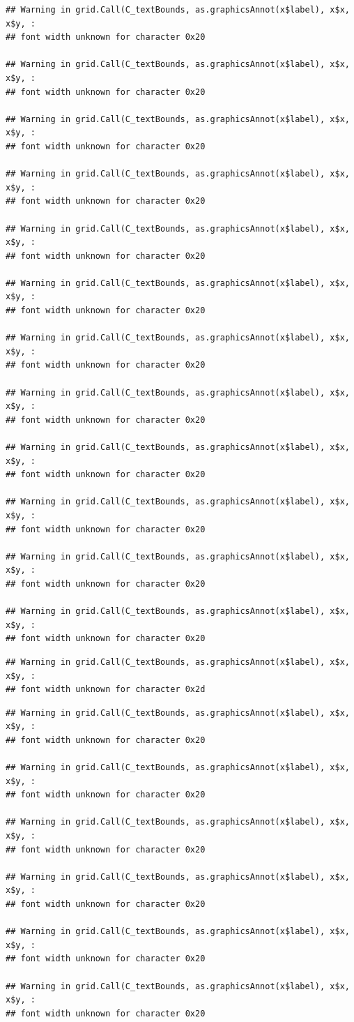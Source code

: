 \documentclass[]{article}
\theoremstyle{definition}
\theoremstyle{definition}
\theoremstyle{definition}
\theoremstyle{remark}
\begin{document}
\begin{verbatim}
## Warning in grid.Call(C_textBounds, as.graphicsAnnot(x$label), x$x, x$y, :
## font width unknown for character 0x20

## Warning in grid.Call(C_textBounds, as.graphicsAnnot(x$label), x$x, x$y, :
## font width unknown for character 0x20

## Warning in grid.Call(C_textBounds, as.graphicsAnnot(x$label), x$x, x$y, :
## font width unknown for character 0x20

## Warning in grid.Call(C_textBounds, as.graphicsAnnot(x$label), x$x, x$y, :
## font width unknown for character 0x20

## Warning in grid.Call(C_textBounds, as.graphicsAnnot(x$label), x$x, x$y, :
## font width unknown for character 0x20

## Warning in grid.Call(C_textBounds, as.graphicsAnnot(x$label), x$x, x$y, :
## font width unknown for character 0x20

## Warning in grid.Call(C_textBounds, as.graphicsAnnot(x$label), x$x, x$y, :
## font width unknown for character 0x20

## Warning in grid.Call(C_textBounds, as.graphicsAnnot(x$label), x$x, x$y, :
## font width unknown for character 0x20

## Warning in grid.Call(C_textBounds, as.graphicsAnnot(x$label), x$x, x$y, :
## font width unknown for character 0x20

## Warning in grid.Call(C_textBounds, as.graphicsAnnot(x$label), x$x, x$y, :
## font width unknown for character 0x20

## Warning in grid.Call(C_textBounds, as.graphicsAnnot(x$label), x$x, x$y, :
## font width unknown for character 0x20

## Warning in grid.Call(C_textBounds, as.graphicsAnnot(x$label), x$x, x$y, :
## font width unknown for character 0x20
\end{verbatim}

\begin{verbatim}
## Warning in grid.Call(C_textBounds, as.graphicsAnnot(x$label), x$x, x$y, :
## font width unknown for character 0x2d
\end{verbatim}

\begin{verbatim}
## Warning in grid.Call(C_textBounds, as.graphicsAnnot(x$label), x$x, x$y, :
## font width unknown for character 0x20

## Warning in grid.Call(C_textBounds, as.graphicsAnnot(x$label), x$x, x$y, :
## font width unknown for character 0x20

## Warning in grid.Call(C_textBounds, as.graphicsAnnot(x$label), x$x, x$y, :
## font width unknown for character 0x20

## Warning in grid.Call(C_textBounds, as.graphicsAnnot(x$label), x$x, x$y, :
## font width unknown for character 0x20

## Warning in grid.Call(C_textBounds, as.graphicsAnnot(x$label), x$x, x$y, :
## font width unknown for character 0x20

## Warning in grid.Call(C_textBounds, as.graphicsAnnot(x$label), x$x, x$y, :
## font width unknown for character 0x20
\end{verbatim}
\end{document}
